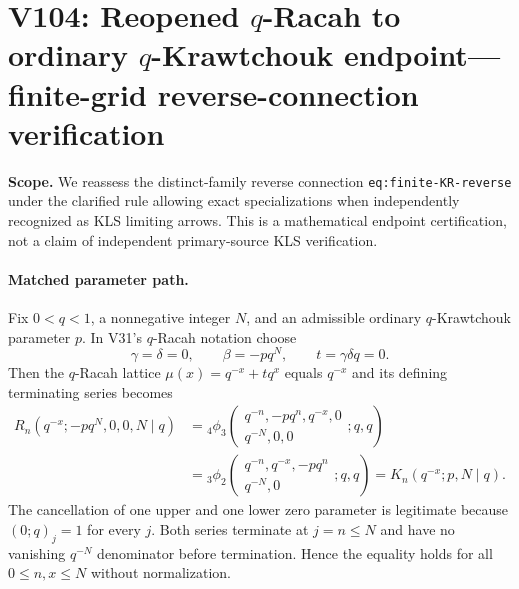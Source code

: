 \documentclass[11pt]{article}
\begin{document}
\clearpage
\section{V104: Reopened $q$-Racah to ordinary $q$-Krawtchouk endpoint---finite-grid reverse-connection verification}
\noindent\textbf{Scope.} We reassess the distinct-family reverse connection \texttt{eq:finite-KR-reverse} under the clarified rule allowing exact specializations when independently recognized as KLS limiting arrows. This is a mathematical endpoint certification, not a claim of independent primary-source KLS verification.

\paragraph{Matched parameter path.} Fix $0<q<1$, a nonnegative integer $N$, and an admissible ordinary $q$-Krawtchouk parameter $p$. In V31's $q$-Racah notation choose
\[
 \gamma=\delta=0,\qquad \beta=-p q^N,\qquad t=\gamma\delta q=0.
\]
Then the $q$-Racah lattice $\mu(x)=q^{-x}+tq^x$ equals $q^{-x}$ and its defining terminating series becomes
\[
 \begin{aligned}
 R_n(q^{-x};-pq^N,0,0,N\mid q)
 &= {}_4\phi_3\!\left(\begin{matrix}q^{-n},-pq^n,q^{-x},0\\q^{-N},0,0\end{matrix};q,q\right)\\
 &= {}_3\phi_2\!\left(\begin{matrix}q^{-n},q^{-x},-pq^n\\q^{-N},0\end{matrix};q,q\right)
 =K_n(q^{-x};p,N\mid q).
 \end{aligned}
\]
The cancellation of one upper and one lower zero parameter is legitimate because $(0;q)_j=1$ for every $j$. Both series terminate at $j=n\le N$ and have no vanishing $q^{-N}$ denominator before termination. Hence the equality holds for all $0\le n,x\le N$ without normalization.
\end{document}
